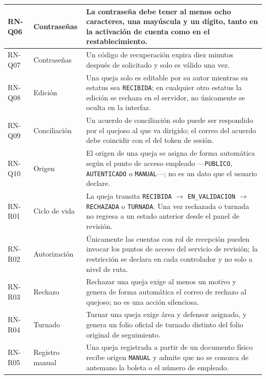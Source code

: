 \begin{longtable}{|p{1.7cm}|p{2.7cm}|p{9.7cm}|}
		RN-Q06 & Contraseñas & La contraseña debe tener al menos ocho caracteres, una mayúscula y un
		dígito, tanto en la activación de cuenta como en el restablecimiento. \\ \hline
	
		RN-Q07 & Contraseñas & Un código de recuperación expira diez minutos después de solicitado y
		solo es válido una vez. \\ \hline
	
		RN-Q08 & Edición & Una queja solo es editable por su autor mientras su estatus sea
		\texttt{RECIBIDA}; en cualquier otro estatus la edición se rechaza en el servidor, no
		únicamente se oculta en la interfaz. \\ \hline
	
		RN-Q09 & Conciliación & Un acuerdo de conciliación solo puede ser respondido por el quejoso
		al que va dirigido; el correo del acuerdo debe coincidir con el del token de sesión.
		\\ \hline
	
		RN-Q10 & Origen & El origen de una queja se asigna de forma automática según el punto de
		acceso empleado ---\texttt{PUBLICO}, \texttt{AUTENTICADO} o \texttt{MANUAL}---; no es un dato
		que el usuario declare. \\ \hline
	
		RN-R01 & Ciclo de vida & La queja transita \texttt{RECIBIDA} $\rightarrow$
		\texttt{EN\_VALIDACION} $\rightarrow$ \texttt{RECHAZADA} o \texttt{TURNADA}. Una vez
		rechazada o turnada no regresa a un estado anterior desde el panel de revisión. \\ \hline
	
		RN-R02 & Autorización & Únicamente las cuentas con rol de recepción pueden invocar los
		puntos de acceso del servicio de revisión; la restricción se declara en cada controlador y no
		solo a nivel de ruta. \\ \hline
	
		RN-R03 & Rechazo & Rechazar una queja exige al menos un motivo y genera de forma automática
		el correo de rechazo al quejoso; no es una acción silenciosa. \\ \hline
	
		RN-R04 & Turnado & Turnar una queja exige área y defensor asignado, y genera un folio oficial
		de turnado distinto del folio original de seguimiento. \\ \hline
	
		RN-R05 & Registro manual & Una queja registrada a partir de un documento físico recibe origen
		\texttt{MANUAL} y admite que no se conozca de antemano la boleta o el número de empleado.
		\\ \hline
	

\end{longtable}
